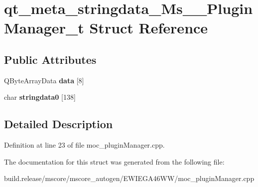 \hypertarget{structqt__meta__stringdata___ms_____plugin_manager__t}{}\section{qt\+\_\+meta\+\_\+stringdata\+\_\+\+Ms\+\_\+\+\_\+\+Plugin\+Manager\+\_\+t Struct Reference}
\label{structqt__meta__stringdata___ms_____plugin_manager__t}
\subsection*{Public Attributes}
\begin{DoxyCompactItemize}
\item 
\mbox{\label{structqt__meta__stringdata___ms_____plugin_manager__t_ae52ef182d0a263b8d62d9e979f148a5a}} 
Q\+Byte\+Array\+Data {\bfseries data} \mbox{[}8\mbox{]}
\item 
\mbox{\label{structqt__meta__stringdata___ms_____plugin_manager__t_a917561c6f3c6337107169c636f0be6b4}} 
char {\bfseries stringdata0} \mbox{[}138\mbox{]}
\end{DoxyCompactItemize}


\subsection{Detailed Description}


Definition at line 23 of file moc\+\_\+plugin\+Manager.\+cpp.



The documentation for this struct was generated from the following file\+:\begin{DoxyCompactItemize}
\item 
build.\+release/mscore/mscore\+\_\+autogen/\+E\+W\+I\+E\+G\+A46\+W\+W/moc\+\_\+plugin\+Manager.\+cpp\end{DoxyCompactItemize}
